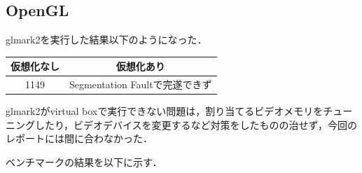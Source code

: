 \documentclass[onecolumn]{preport}
\begin{document}
\subsection{OpenGL}
glmark2を実行した結果以下のようになった．
\begin{table}[H]
  \begin{tabular}{c|c} \hline
    仮想化なし & 仮想化あり \\ \hline
    1149  & Segmentation Faultで完遂できず \\ \hline
  \end{tabular}
\end{table}
glmark2がvirtual boxで実行できない問題は，割り当てるビデオメモリをチューニングしたり，ビデオデバイスを変更するなど対策をしたものの治せず，今回のレポートには間に合わなかった．

ベンチマークの結果を以下に示す．
\end{document}
